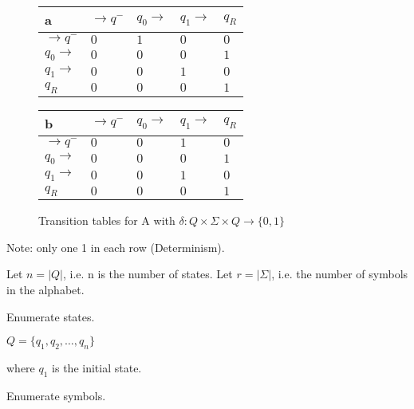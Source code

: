 \documentclass[runningheads,a4paper]{llncs}
\begin{document}
\begin{figure}
\begin{center}

	\setlength{\tabcolsep}{4pt}
	\renewcommand{\arraystretch}{1.4}

	\begin{tabular}{|P{1.0cm} || P{0.8cm} | P{0.8cm} | P{0.8cm} | P{0.8cm}|}
	\hline
	a & $\rightarrow q^-$ & $q_0 \rightarrow$ & $q_1 \rightarrow$ & $q_R$ \\
	\hline
	\hline
	$\rightarrow q^-$ 		& $0$ & $1$ & $0$ & $0$ \\
	\hline
	$q_0 \rightarrow$ 		& $0$ & $0$ & $0$ & $1$ \\
	\hline
	$q_1 \rightarrow$ 		& $0$ & $0$ & $1$ & $0$ \\
	\hline
	$q_R$  					& $0$ & $0$ & $0$ & $1$ \\
	\hline
	
	\end{tabular}
	\hspace*{1 cm}
	\begin{tabular}{|P{1.0cm} || P{0.8cm} | P{0.8cm} | P{0.8cm} | P{0.8cm}|}
	\hline
	b & $\rightarrow q^-$ & $q_0 \rightarrow$ & $q_1 \rightarrow$ & $q_R$ \\
	\hline
	\hline
	$\rightarrow q^-$ 		& $0$ & $0$ & $1$ & $0$ \\
	\hline
	$q_0 \rightarrow$ 		& $0$ & $0$ & $0$ & $1$ \\
	\hline
	$q_1 \rightarrow$ 		& $0$ & $0$ & $1$ & $0$ \\
	\hline
	$q_R$  					& $0$ & $0$ & $0$ & $1$ \\
	\hline
	
	\end{tabular}
	
\caption{Transition tables for A with $\delta: Q \times \Sigma \times Q \rightarrow \{0,1\}$}

\label{fig:ttable_bin}
\end{center}
\end{figure}

Note: only one 1 in each row (Determinism).

Let $n = |Q|$, i.e. n is the number of states.
Let $r = |\Sigma|$, i.e. the number of symbols in the alphabet.

Enumerate states.
\begin{center}
	$Q = \{q_1, q_2, \ldots, q_n\}$
\end{center}
where $q_1$ is the initial state.

Enumerate symbols.
\end{document}
